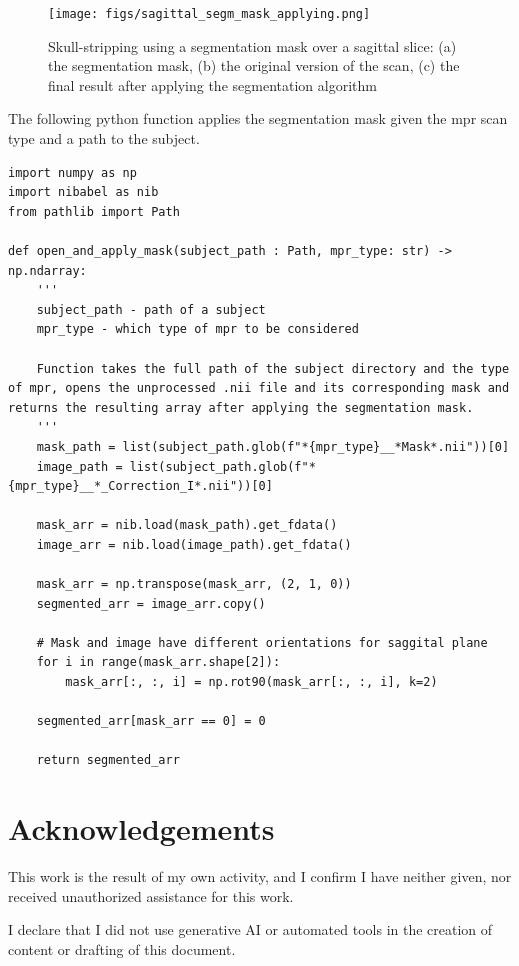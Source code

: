 \documentclass[a4paper, 12pt]{article}
\begin{document}
\begin{figure}[htbp]
    \centering
    \texttt{[image: figs/sagittal\_segm\_mask\_applying.png]}
    \caption{Skull-stripping using a segmentation mask over a sagittal slice: (a) the segmentation mask, (b) the
        original version of the scan, (c) the final result after applying the segmentation algorithm
    }
    \label{fig:segm-mask}
\end{figure}

\newpage
The following python function applies the segmentation mask given the mpr scan type and a path to the subject.
\begin{lstlisting}
import numpy as np
import nibabel as nib
from pathlib import Path

def open_and_apply_mask(subject_path : Path, mpr_type: str) -> np.ndarray:
    '''
    subject_path - path of a subject
    mpr_type - which type of mpr to be considered

    Function takes the full path of the subject directory and the type of mpr, opens the unprocessed .nii file and its corresponding mask and returns the resulting array after applying the segmentation mask.
    '''
    mask_path = list(subject_path.glob(f"*{mpr_type}__*Mask*.nii"))[0]
    image_path = list(subject_path.glob(f"*{mpr_type}__*_Correction_I*.nii"))[0]

    mask_arr = nib.load(mask_path).get_fdata()
    image_arr = nib.load(image_path).get_fdata()

    mask_arr = np.transpose(mask_arr, (2, 1, 0))
    segmented_arr = image_arr.copy()

    # Mask and image have different orientations for saggital plane
    for i in range(mask_arr.shape[2]): 
        mask_arr[:, :, i] = np.rot90(mask_arr[:, :, i], k=2)

    segmented_arr[mask_arr == 0] = 0

    return segmented_arr
\end{lstlisting}

\newpage
\section{Acknowledgements}

This work is the result of my own activity, and I confirm I have neither given, nor received unauthorized assistance for this work.

I declare that I did not use generative AI or automated tools in the creation of content or drafting of this document.
\end{document}
